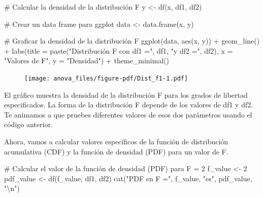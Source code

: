 \documentclass[
  letterpaper,
  DIV=11,
  numbers=noendperiod]{scrreprt}
\newenvironment{Shaded}{\begin{snugshade}}{\end{snugshade}}
\newcommand{\AttributeTok}[1]{\textcolor[rgb]{0.40,0.45,0.13}{#1}}
\newcommand{\CommentTok}[1]{\textcolor[rgb]{0.37,0.37,0.37}{#1}}
\newcommand{\DecValTok}[1]{\textcolor[rgb]{0.68,0.00,0.00}{#1}}
\newcommand{\FunctionTok}[1]{\textcolor[rgb]{0.28,0.35,0.67}{#1}}
\newcommand{\NormalTok}[1]{\textcolor[rgb]{0.00,0.23,0.31}{#1}}
\newcommand{\OtherTok}[1]{\textcolor[rgb]{0.00,0.23,0.31}{#1}}
\newcommand{\SpecialCharTok}[1]{\textcolor[rgb]{0.37,0.37,0.37}{#1}}
\newcommand{\StringTok}[1]{\textcolor[rgb]{0.13,0.47,0.30}{#1}}
\begin{document}
\begin{tcolorbox}
\begin{Shaded}
\begin{Highlighting}[]
\CommentTok{\# Calcular la densidad de la distribución F}
\NormalTok{y }\OtherTok{\textless{}{-}} \FunctionTok{df}\NormalTok{(x, df1, df2)}

\CommentTok{\# Crear un data frame para ggplot}
\NormalTok{data }\OtherTok{\textless{}{-}} \FunctionTok{data.frame}\NormalTok{(x, y)}

\CommentTok{\# Graficar la densidad de la distribución F}
\FunctionTok{ggplot}\NormalTok{(data, }\FunctionTok{aes}\NormalTok{(x, y)) }\SpecialCharTok{+}
  \FunctionTok{geom\_line}\NormalTok{() }\SpecialCharTok{+}
  \FunctionTok{labs}\NormalTok{(}\AttributeTok{title =} \FunctionTok{paste}\NormalTok{(}\StringTok{"Distribución F con df1 ="}\NormalTok{, df1, }\StringTok{"y df2 ="}\NormalTok{, df2),}
       \AttributeTok{x =} \StringTok{"Valores de F"}\NormalTok{,}
       \AttributeTok{y =} \StringTok{"Densidad"}\NormalTok{) }\SpecialCharTok{+}
  \FunctionTok{theme\_minimal}\NormalTok{()}
\end{Highlighting}
\end{Shaded}

\begin{figure}[H]

{\centering \texttt{[image: anova\_files/figure-pdf/Dist\_f1-1.pdf]}

}

\end{figure}

El gráfico muestra la densidad de la distribución F para los grados de
libertad especificados. La forma de la distribución F depende de los
valores de df1 y df2. Te animamos a que pruebes diferentes valores de
esos dos parámetros usando el código anterior.

Ahora, vamos a calcular valores específicos de la función de
distribución acumulativa (CDF) y la función de densidad (PDF) para un
valor de F.

\begin{Shaded}
\begin{Highlighting}[]
\CommentTok{\# Calcular el valor de la función de densidad (PDF) para F = 2}
\NormalTok{f\_value }\OtherTok{\textless{}{-}} \DecValTok{2}
\NormalTok{pdf\_value }\OtherTok{\textless{}{-}} \FunctionTok{df}\NormalTok{(f\_value, df1, df2)}
\FunctionTok{cat}\NormalTok{(}\StringTok{"PDF en F ="}\NormalTok{, f\_value, }\StringTok{"es"}\NormalTok{, pdf\_value, }\StringTok{"}\SpecialCharTok{\textbackslash{}n}\StringTok{"}\NormalTok{)}
\end{Highlighting}
\end{Shaded}


\end{tcolorbox}
\end{document}
